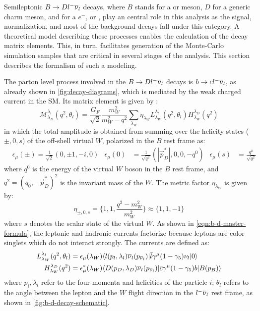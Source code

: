 Semileptonic $B \rightarrow D {l^-}{{\overline{\nu}}_l}$ decays,
where $B$ stands for a \Bzb or \Bm meson,
$D$ for a generic charm meson, and \ellm for a $e^-$, \mun or \taum,
play an central role in this analysis as the signal, normalization,
and most of the background decays fall under this category.
A theoretical model describing these processes enables the calculation of the
decay matrix elements.
This, in turn, facilitates generation of the Monte-Carlo simulation samples that
are critical in several stages of the analysis.
This section describes the formalism of such a modeling.

The parton level process involved in the $B \rightarrow D {l^-}{{\overline{\nu}}_l}$ decays is
$b \rightarrow c {l^-}{{\overline{\nu}}_l}$,
as already shown in \cref{fig:decay-diagrams},
which is mediated by the weak charged current in the SM.
Its matrix element is given by \cite{Tanaka_1995}:
\begin{equation}
    \mathcal{M}^{\lambda_l}_{\lambda_D}(q^2, \theta_l) =
    \frac{G_F}{\sqrt{2}} \frac{m^2_W}{m^2_W - q^2}
    \sum_{\lambda_W} \eta_{\lambda_W}
    L^{\lambda_l}_{\lambda_W}(q^2, \theta_l)
    H^{\lambda_D}_{\lambda_W}(q^2)
    \label{eqn:b-d-master-formula}
\end{equation}
in which the total amplitude is obtained from summing over the helicity states
($\pm,0,s$)
of the off-shell virtual $W$,
polarized in the $B$ rest frame as:
\begin{align}
    & \epsilon_\mu(\pm) = \frac{1}{\sqrt{2}}(0, \pm1, -i, 0)
    & \epsilon_\mu(0) &= \frac{1}{\sqrt{q^2}}(|\vec{p}^*_D|, 0, 0, -q^0)
    & \epsilon_\mu(s) &= \frac{q^\mu}{\sqrt{q^2}}
\end{align}
where $q^0$ is the energy of the virtual $W$ boson in the $B$ rest frame,
and $q^2 = (q_0, -\vec{p}^*_D)^2$ is the invariant mass of the $W$.
The metric factor $\eta_{\lambda_W}$ is given by:
\begin{equation}
    \eta_{\pm,0,s} = \{1, 1, \frac{q^2 - m_W^2}{m_W^2}\} \approx \{1, 1, -1\}
\end{equation}
where $s$ denotes the scalar state of the virtual $W$.
As shown in \cref{eqn:b-d-master-formula},
the leptonic and hadronic currents factorize because leptons
are color singlets which do not interact strongly.
The currents are defined as:
\begin{align}
    L^{\lambda_l}_{\lambda_W}(q^2, \theta_l)
    & =
    \epsilon_\mu(\lambda_W)
    \langle l(p_l, \lambda_l) {{\overline{\nu}}_l}(p_{{\overline{\nu}}_l})\rvert \bar{l} \gamma^\mu (1 - \gamma_5) {{\nu}_l}
    \lvert0\rangle \\
    H^{\lambda_D}_{\lambda_W}(q^2)
    & =
    \epsilon^*_\mu(\lambda_W)
    \langle D(p_D, \lambda_D) {{\overline{\nu}}_l}(p_{{\overline{\nu}}_l})\rvert \bar{c} \gamma^\mu (1 - \gamma_5) b
    \lvert B(p_B)\rangle
\end{align}
where $p_i, \lambda_i$ refer to the four-momenta and helicities of the particle
$i$;
$\theta_l$ refers to the angle between the lepton and the $W$ flight direction
in the ${l^-}{{\overline{\nu}}_l}$ rest frame,
as shown in \cref{fig:b-d-decay-schematic}.

